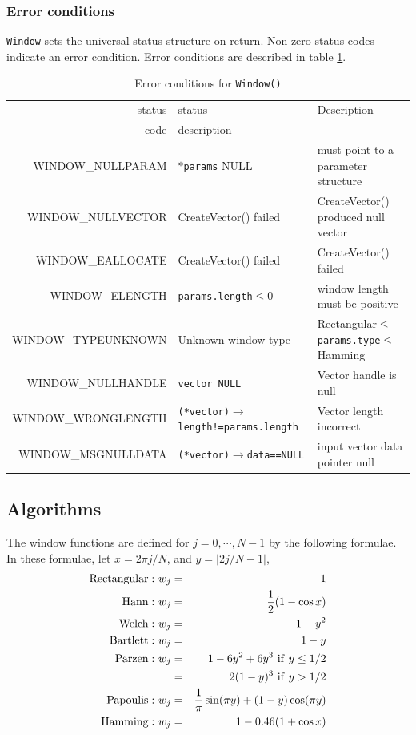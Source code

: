 \documentclass{article}
\begin{document}
\subsubsection{Error conditions}


{\tt Window\/}
sets the universal status structure on return. Non-zero status codes
indicate an error condition. Error conditions are described in
table \ref{tbl:WI}.

\begin{table}
\hskip -0.7in
\begin{tabular}{|r|l|l|}\hline
status&status&Description\\
code&description&\\\hline
WINDOW\_NULLPARAM&$*${\tt params} NULL&must point to a parameter structure\\
WINDOW\_NULLVECTOR&CreateVector() failed&CreateVector() produced null vector\\
WINDOW\_EALLOCATE&CreateVector() failed &CreateVector() failed\\
WINDOW\_ELENGTH&{\tt params.length}$\le 0$&window length must be positive\\
WINDOW\_TYPEUNKNOWN&Unknown window type&Rectangular$\le${\tt params.type}$\le$Hamming\\
WINDOW\_NULLHANDLE&{\tt *vector NULL}&Vector handle is null\\
WINDOW\_WRONGLENGTH&{\tt (*vector)$\rightarrow$length!=params.length}&Vector length incorrect\\
WINDOW\_MSGNULLDATA&{\tt (*vector)$\rightarrow$data==NULL}&input vector data pointer null\\
\hline
\end{tabular}
\caption{Error conditions for {\tt Window()}}\label{tbl:WI}
\end{table}

                                
\subsection{Algorithms}

The window functions are defined for $j=0,\cdots,N-1$ by the following formulae.
In these formulae, let $x=2 \pi j/N$, and $y=|2j/N-1|$,
\begin{eqnarray*}
{\rm Rectangular:\ } w_j &=& 1 \\
{\rm Hann:\ } w_j &=& {1 \over 2} ( 1 - \cos  x  ) \\
{\rm Welch:\ } w_j &=& 1 -  y^2 \\
{\rm Bartlett:\ } w_j &=& 1 -  y \\
{\rm Parzen:\ } w_j &=&  1 - 6 y^2 + 6 y^3  {\rm\ if\ } y\le 1/2\\
                    &=&  2 (1-y)^3 {\rm\ if\ } y>1/2\\
{\rm Papoulis:\ } w_j &=& {1 \over \pi} \sin (\pi  y  ) + ( 1 -  y  ) \cos (\pi  y  )\\
{\rm Hamming:\ } w_j &=& 1-0.46 (1 + \cos x ) \\
\end{eqnarray*}
\end{document}
